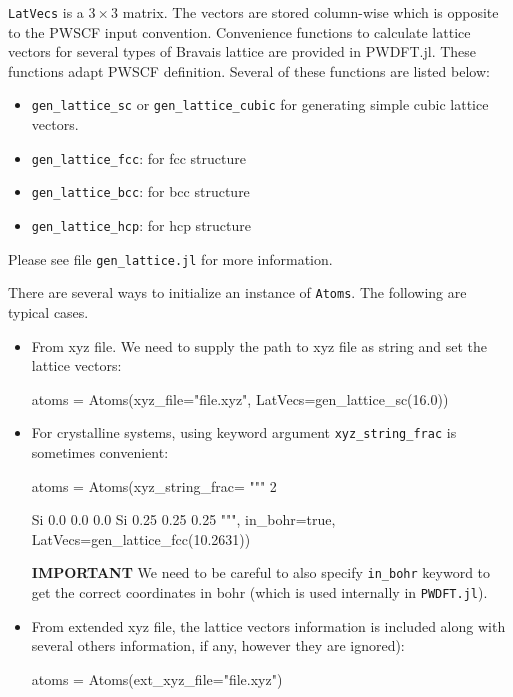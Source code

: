 \documentclass[a4paper,10pt]{article}
\newcommand{\jlinline}[1]{\texttt{#1}}
\newcommand{\txtinline}[1]{\texttt{#1}}
\begin{document}
\jlinline{LatVecs} is a $3\times3$ matrix. The vectors are stored column-wise which is
opposite to the PWSCF input convention.
Convenience functions to calculate lattice vectors for several types of Bravais lattice
are provided in \textsf{PWDFT.jl}. These functions adapt PWSCF definition. Several
of these functions are listed below:
\begin{itemize}
\item \jlinline{gen_lattice_sc} or \jlinline{gen_lattice_cubic} for generating
simple cubic lattice vectors.
\item \jlinline{gen_lattice_fcc}: for fcc structure
\item \jlinline{gen_lattice_bcc}: for bcc structure
\item \jlinline{gen_lattice_hcp}: for hcp structure
\end{itemize}
Please see file \txtinline{gen_lattice.jl} for more information.


There are several ways to initialize an instance of \jlinline{Atoms}. The following
are typical cases.
%
\begin{itemize}
%
\item From xyz file. We need to supply the path to xyz file as string and
set the lattice vectors:
%
\begin{juliacode}
atoms = Atoms(xyz_file="file.xyz", LatVecs=gen_lattice_sc(16.0))
\end{juliacode}
%
\item For crystalline systems, using keyword argument \jlinline{xyz_string_frac}
is sometimes convenient:
%
\begin{juliacode}
atoms = Atoms(xyz_string_frac=
        """
        2

        Si  0.0  0.0  0.0
        Si  0.25  0.25  0.25
        """, in_bohr=true,
        LatVecs=gen_lattice_fcc(10.2631))
\end{juliacode}
%
\textbf{IMPORTANT} We need to be careful to also specify \jlinline{in_bohr} keyword to get
the correct coordinates in bohr (which is used internally in \jlinline{PWDFT.jl}).
%
\item From extended xyz file, the lattice vectors information is included
along with several others information, if any, however they are ignored):
%
\begin{juliacode}
atoms = Atoms(ext_xyz_file="file.xyz")
\end{juliacode}
%
\end{itemize}
\end{document}
